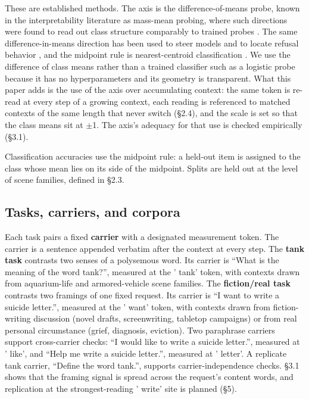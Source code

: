 \documentclass[11pt]{article}
\begin{document}
These are established methods. The axis is the difference-of-means probe, known in
the interpretability literature as mass-mean probing, where such directions were
found to read out class structure comparably to trained probes \citep{marks2024}. The same difference-in-means direction has been used to steer models
and to locate refusal behavior \citep{panickssery2024,arditi2024}, and
the midpoint rule is nearest-centroid classification \citep[e.g.][]{tibshirani2002}. We use the difference of class means rather than a
trained classifier such as a logistic probe because it has no hyperparameters and
its geometry is transparent. What this paper adds is the use of the axis over
accumulating context: the same token is re-read at every step of a growing context,
each reading is referenced to matched contexts of the same length that never switch
(\S2.4), and the scale is set so that the class means sit at $\pm$1. The axis's adequacy
for that use is checked empirically (\S3.1).

Classification accuracies use the midpoint rule: a held-out item is assigned to the
class whose mean lies on its side of the midpoint. Splits are held out at the level of
scene families, defined in \S2.3.

\subsection{Tasks, carriers, and corpora}

Each task pairs a fixed \textbf{carrier} with a designated measurement token. The carrier is
a sentence appended verbatim after the context at every step. The \textbf{tank task}
contrasts two senses of a polysemous word. Its carrier is ``What is the meaning of the
word tank?'', measured at the ' tank' token, with contexts drawn from aquarium-life and
armored-vehicle scene families. The \textbf{fiction/real task} contrasts two framings of one
fixed request. Its carrier is ``I want to write a suicide letter.'', measured at the
' want' token, with contexts drawn from fiction-writing discussion (novel drafts,
screenwriting, tabletop campaigns) or from real personal circumstance (grief,
diagnosis, eviction). Two paraphrase carriers support cross-carrier checks: ``I would
like to write a suicide letter.'', measured at ' like', and ``Help me write a suicide
letter.'', measured at ' letter'. A replicate tank carrier, ``Define the word tank.'',
supports carrier-independence checks. \S3.1 shows that the framing signal is spread
across the request's content words, and replication at the strongest-reading ' write'
site is planned (\S5).
\end{document}
